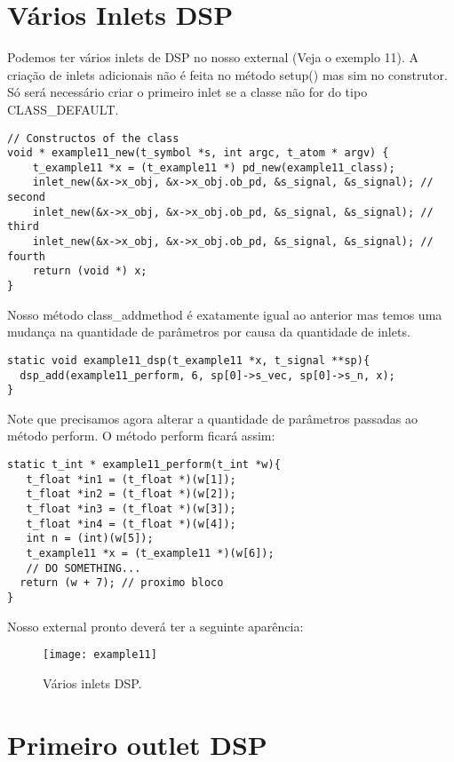 \section{Vários Inlets DSP}
Podemos ter vários inlets de DSP no nosso external (Veja o exemplo 11). A
criação de inlets adicionais não é feita no método setup() mas sim no
construtor. Só será necessário criar o primeiro inlet se a classe não for do
tipo CLASS\_DEFAULT.

\begin{lstlisting}
// Constructos of the class
void * example11_new(t_symbol *s, int argc, t_atom * argv) {
    t_example11 *x = (t_example11 *) pd_new(example11_class);
    inlet_new(&x->x_obj, &x->x_obj.ob_pd, &s_signal, &s_signal); // second
    inlet_new(&x->x_obj, &x->x_obj.ob_pd, &s_signal, &s_signal); // third
    inlet_new(&x->x_obj, &x->x_obj.ob_pd, &s_signal, &s_signal); // fourth
    return (void *) x;
}
\end{lstlisting}

Nosso método class\_addmethod é exatamente igual ao anterior mas temos uma
mudança na quantidade de parâmetros por causa da quantidade de inlets.

\begin{lstlisting}
static void example11_dsp(t_example11 *x, t_signal **sp){
  dsp_add(example11_perform, 6, sp[0]->s_vec, sp[0]->s_n, x);
}
\end{lstlisting}

Note que precisamos agora alterar a quantidade de parâmetros passadas ao método
perform. O método perform ficará assim:
\begin{lstlisting}
static t_int * example11_perform(t_int *w){
   t_float *in1 = (t_float *)(w[1]);
   t_float *in2 = (t_float *)(w[2]);
   t_float *in3 = (t_float *)(w[3]);
   t_float *in4 = (t_float *)(w[4]);
   int n = (int)(w[5]);
   t_example11 *x = (t_example11 *)(w[6]);
   // DO SOMETHING...
  return (w + 7); // proximo bloco
}
\end{lstlisting}

Nosso external pronto deverá ter a seguinte aparência:
\begin{figure}[h!]
	\centering
	\texttt{[image: example11]}
	\caption{Vários inlets DSP.}
\end{figure}

\section{Primeiro outlet DSP}

